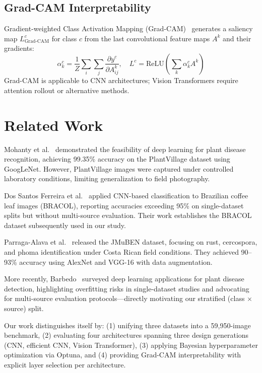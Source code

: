 \documentclass[conference]{IEEEtran}
\begin{document}
\subsection{Grad-CAM Interpretability}

Gradient-weighted Class Activation Mapping (Grad-CAM)~\cite{selvaraju2017}
generates a saliency map $L^c_{\text{Grad-CAM}}$ for class $c$ from the
last convolutional feature maps $A^k$ and their gradients:
\begin{equation}
  \alpha^c_k = \frac{1}{Z}\sum_{i}\sum_{j}
    \frac{\partial y^c}{\partial A^k_{ij}}, \quad
  L^c = \text{ReLU}\!\left(\sum_k \alpha^c_k A^k\right)
  \label{eq:gradcam}
\end{equation}
Grad-CAM is applicable to CNN architectures; Vision Transformers require
attention rollout or alternative methods.

\section{Related Work}

Mohanty et al.~\cite{mohanty2016} demonstrated the feasibility of deep
learning for plant disease recognition, achieving 99.35\% accuracy on the
PlantVillage dataset using GoogLeNet. However, PlantVillage images were
captured under controlled laboratory conditions, limiting generalization to
field photography.

Dos Santos Ferreira et al.~\cite{ferreira2017} applied CNN-based
classification to Brazilian coffee leaf images (BRACOL), reporting
accuracies exceeding 95\% on single-dataset splits but without multi-source
evaluation. Their work establishes the BRACOL dataset subsequently used in
our study.

Parraga-Alava et al.~\cite{parraga2019} released the JMuBEN dataset,
focusing on rust, cercospora, and phoma identification under Costa Rican
field conditions. They achieved 90--93\% accuracy using AlexNet and VGG-16
with data augmentation.

More recently, Barbedo~\cite{barbedo2019} surveyed deep learning
applications for plant disease detection, highlighting overfitting risks in
single-dataset studies and advocating for multi-source evaluation
protocols—directly motivating our stratified (class $\times$ source) split.

Our work distinguishes itself by: (1) unifying three datasets into a
59{,}950-image benchmark, (2) evaluating four architectures spanning three
design generations (CNN, efficient CNN, Vision Transformer), (3) applying
Bayesian hyperparameter optimization via Optuna, and (4) providing Grad-CAM
interpretability with explicit layer selection per architecture.
\end{document}
